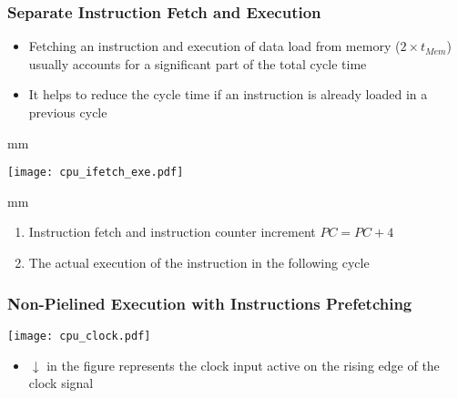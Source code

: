 \documentclass{beamer}
\begin{document}
\begin{frame}
\frametitle{Separate Instruction Fetch and Execution}

\begin{itemize}
 \item Fetching an instruction and execution of data load from memory ($2 \times t_{Mem}$) usually accounts for a significant part of the total cycle time
 \item It helps to reduce the cycle time if an instruction is already loaded in a previous cycle
\end{itemize}

 mm

{
\centering
\texttt{[image: cpu\_ifetch\_exe.pdf]}
}

 mm

\begin{enumerate}
 \item Instruction fetch and instruction counter increment $PC = PC + 4$
 \item The actual execution of the instruction in the following cycle
\end{enumerate}

\end{frame}

\begin{frame}
\frametitle{Non-Pielined Execution with Instructions Prefetching}
\texttt{[image: cpu\_clock.pdf]}
\begin{itemize}
 \item $\downarrow$ in the figure represents the clock input active on the rising edge of the clock signal
\end{itemize}

\end{frame}
\end{document}
